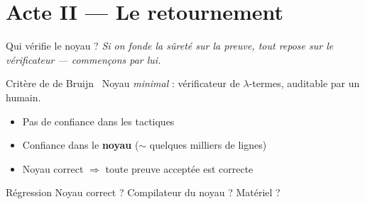 \documentclass[aspectratio=169]{beamer}
\begin{document}
\section{Acte II — Le retournement}

\begin{frame}{Qui vérifie le noyau ?}
  \small\emph{Si on fonde la sûreté sur la preuve, tout repose sur le vérificateur —
  commençons par lui.}
  \medskip

  \begin{block}{Critère de de Bruijn~\cite{debruijn1980automath}}
    Noyau \emph{minimal} : vérificateur de $\lambda$-termes, auditable par un humain.
  \end{block}
  \medskip

  \begin{itemize}
    \item Pas de confiance dans les tactiques
    \item Confiance dans le \textbf{noyau} ($\sim$ quelques milliers de lignes)
    \item Noyau correct $\Rightarrow$ toute preuve acceptée est correcte
  \end{itemize}
  \pause
  \medskip

  \begin{alertblock}{Régression}
    Noyau correct ? \quad Compilateur du noyau ? \quad Matériel ?
  \end{alertblock}
\end{frame}
\end{document}
